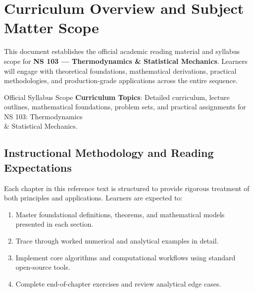\section{Curriculum Overview and Subject Matter Scope}

This document establishes the official academic reading material and syllabus scope for \textbf{NS 103 --- Thermodynamics \& Statistical Mechanics}. Learners will engage with theoretical foundations, mathematical derivations, practical methodologies, and production-grade applications across the entire sequence.

\begin{InsightBox}{Official Syllabus Scope}
  \textbf{Curriculum Topics}: Detailed curriculum, lecture outlines, mathematical foundations, problem sets, and practical assignments for NS 103: Thermodynamics \\& Statistical Mechanics.
\end{InsightBox}

\subsection{Instructional Methodology and Reading Expectations}

Each chapter in this reference text is structured to provide rigorous treatment of both principles and applications. Learners are expected to:
\begin{enumerate}
  \item Master foundational definitions, theorems, and mathematical models presented in each section.
  \item Trace through worked numerical and analytical examples in detail.
  \item Implement core algorithms and computational workflows using standard open-source tools.
  \item Complete end-of-chapter exercises and review analytical edge cases.
\end{enumerate}

